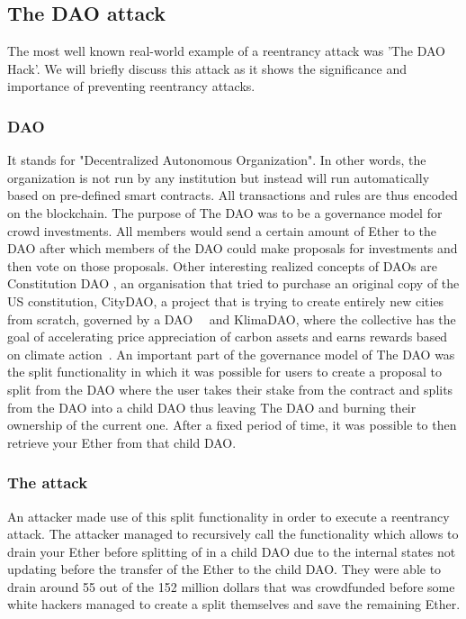 \documentclass[10pt,conference]{IEEEtran}
\begin{document}
\subsection{The DAO attack}
The most well known real-world example of a reentrancy attack was 'The DAO Hack'. We will briefly discuss this attack as it shows the significance and importance of preventing reentrancy attacks.
\subsubsection{DAO}
 It stands for "Decentralized Autonomous Organization". In other words, the organization is not run by any institution but instead will run automatically based on pre-defined smart contracts. All transactions and rules are thus encoded on the blockchain. The purpose of The DAO was to be a governance model for crowd investments. All members would send a certain amount of Ether to the DAO after which members of the DAO could make proposals for investments and then vote on those proposals. Other interesting realized concepts of DAOs are Constitution DAO \cite{constitution}, an organisation that tried to purchase an original copy of the US constitution, CityDAO, a project that is trying to create entirely new cities from scratch, governed by a DAO~\cite{citydao}~\cite{cryptocities} and KlimaDAO, where the collective has the goal of accelerating price appreciation of carbon assets and earns rewards based on climate action~\cite{klimadao}. 
 An important part of the governance model of The DAO was the split functionality in which it was possible for users to create a proposal to split from the DAO where the user takes their stake from the contract and splits from the DAO into a child DAO thus leaving The DAO and burning their ownership of the current one. After a fixed period of time, it was possible to then retrieve your Ether from that child DAO. 
 
\subsubsection{The attack}
An attacker made use of this split functionality in order to execute a reentrancy attack. The attacker managed to recursively call the functionality which allows to drain your Ether before splitting of in a child DAO due to the internal states not updating before the transfer of the Ether to the child DAO. They were able to drain around 55 out of the 152 million dollars that was crowdfunded before some white hackers managed to create a split themselves and save the remaining Ether. 
\end{document}
